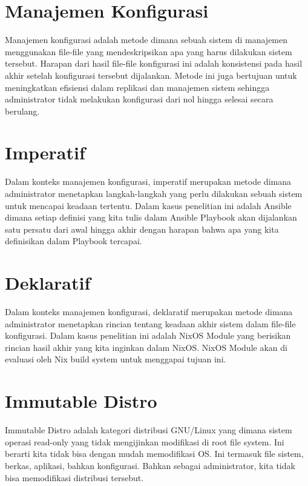 \documentclass[10pt,twoside]{report}
\begin{document}
\section{Manajemen Konfigurasi}
\begin{adjustwidth}{20pt}{}
	\vspace{-3mm}
	Manajemen konfigurasi adalah metode dimana sebuah sistem di manajemen
	menggunakan file-file yang mendeskripsikan apa yang harus dilakukan sistem
	tersebut. Harapan dari hasil file-file konfigurasi ini adalah konsistensi
	pada hasil akhir setelah konfigurasi tersebut dijalankan. Metode ini juga
	bertujuan untuk meningkatkan efisiensi dalam replikasi dan manajemen sistem
	sehingga administrator tidak melakukan konfigurasi dari nol hingga selesai
	secara berulang.
\end{adjustwidth}
\section{Imperatif}
\begin{adjustwidth}{20pt}{}
	\vspace{-3mm}
	Dalam konteks manajemen konfigurasi, imperatif merupakan metode dimana
	administrator menetapkan langkah-langkah yang perlu dilakukan sebuah sistem
	untuk mencapai keadaan tertentu. Dalam kasus penelitian ini adalah Ansible
	dimana setiap definisi yang kita tulis dalam Ansible Playbook akan dijalankan
	satu persatu dari awal hingga akhir dengan harapan bahwa apa yang kita
	definisikan dalam Playbook tercapai.
\end{adjustwidth}
\section{Deklaratif}
\begin{adjustwidth}{20pt}{}
	\vspace{-3mm}
	Dalam konteks manajemen konfigurasi, deklaratif merupakan metode dimana
	administrator menetapkan rincian tentang keadaan akhir sistem dalam file-file
	konfigurasi. Dalam kasus penelitian ini adalah NixOS Module yang berisikan
	rincian hasil akhir yang kita inginkan dalam NixOS. NixOS Module akan di
	evaluasi oleh Nix build system untuk menggapai tujuan ini.
\end{adjustwidth}
\section{Immutable Distro}
\begin{adjustwidth}{20pt}{}
	\vspace{-3mm}
	Immutable Distro adalah kategori distribusi GNU/Linux yang dimana sistem
	operasi read-only yang tidak mengijinkan modifikasi di root file system. Ini
	berarti kita tidak bisa dengan mudah memodifikasi OS. Ini termasuk file
	sistem, berkas, aplikasi, bahkan konfigurasi. Bahkan sebagai administrator,
	kita tidak bisa memodifikasi distribusi tersebut.
\end{adjustwidth}
\end{document}
